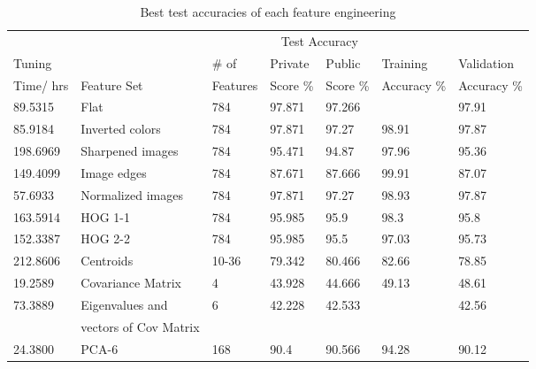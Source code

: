 \documentclass{article}
\begin{document}
\begin{table}[h]
  \caption{Best test accuracies of each feature engineering}
  \label{results}
  \centering
  \begin{tabular}{lllllll}
    \toprule
    &  & & \multicolumn{2}{c}{Test Accuracy}  & & \\             
    \cmidrule(r){4-5}
    Tuning &  & \# of & Private &  Public  & Training  & Validation \\   
    Time/ hrs & Feature Set &  Features & Score \% & Score \% & Accuracy \% & Accuracy \%\\
    \midrule
    89.5315 & Flat      & 784 & 97.871 & 97.266 &  & 97.91 \\
    85.9184 & Inverted colors       & 784 & 97.871 & 97.27 & 98.91 & 97.87 \\
    198.6969 & Sharpened images     & 784 & 95.471 & 94.87 & 97.96 & 95.36 \\
    149.4099 & Image edges    & 784   & 87.671 & 87.666 & 99.91 & 87.07 \\
    57.6933 & Normalized images     & 784 & 97.871 & 97.27 & 98.93 & 97.87 \\
    163.5914 & HOG 1-1  & 784   & 95.985 & 95.9 & 98.3 & 95.8 \\
    152.3387 & HOG 2-2  & 784   & 95.985 & 95.5 & 97.03 & 95.73 \\
     212.8606 & Centroids   & 10-36  & 79.342 & 80.466 & 82.66 & 78.85 \\
    19.2589 & Covariance Matrix     & 4 & 43.928 & 44.666 & 49.13 & 48.61\\
    73.3889 & Eigenvalues and       & 6 & 42.228 & 42.533 &  & 42.56\\
        &   vectors of Cov Matrix   &     & & \\
    24.3800 & PCA-6     & 168 &  90.4  & 90.566 & 94.28 & 90.12\\

    \bottomrule
  \end{tabular}
\end{table}
\end{document}
